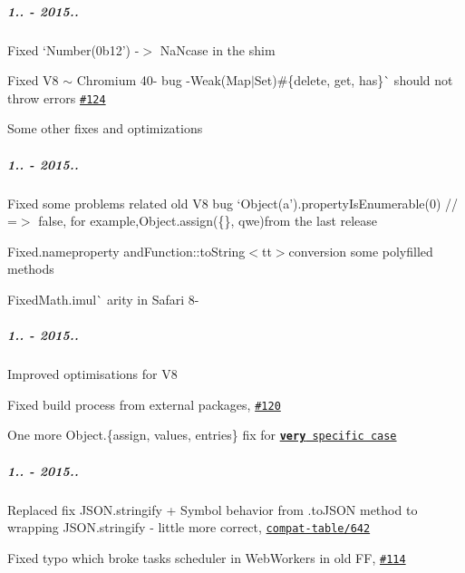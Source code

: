 \subparagraph*{1.. -\/ 2015..}


\begin{DoxyItemize}
\item Fixed `Number(\textquotesingle{}0b12') -\/$>$ NaN{\ttfamily case in the shim}
\item {\ttfamily Fixed V8 $\sim$ Chromium 40-\/ bug -\/}Weak(Map$\vert$\+Set)\#\{delete, get, has\}\`{} should not throw errors \href{https://github.com/zloirock/core-js/issues/124}{\tt \#124}
\item Some other fixes and optimizations
\end{DoxyItemize}

\subparagraph*{1.. -\/ 2015..}


\begin{DoxyItemize}
\item Fixed some problems related old V8 bug `Object(\textquotesingle{}a').property\+Is\+Enumerable(0) // =$>$ false{\ttfamily , for example,}Object.\+assign(\{\}, \textquotesingle{}qwe\textquotesingle{}){\ttfamily from the last release}
\item {\ttfamily Fixed}.name{\ttfamily property and}Function\+::to\+String$<$tt$>$conversion some polyfilled methods
\item FixedMath.\+imul\`{} arity in Safari 8-\/
\end{DoxyItemize}

\subparagraph*{1.. -\/ 2015..}


\begin{DoxyItemize}
\item Improved optimisations for V8
\item Fixed build process from external packages, \href{https://github.com/zloirock/core-js/pull/120}{\tt \#120}
\item One more {\ttfamily Object.\{assign, values, entries\}} fix for \href{https://github.com/ljharb/proposal-object-values-entries/issues/5}{\tt {\bfseries very} specific case}
\end{DoxyItemize}

\subparagraph*{1.. -\/ 2015..}


\begin{DoxyItemize}
\item Replaced fix {\ttfamily J\+S\+O\+N.\+stringify} + {\ttfamily Symbol} behavior from {\ttfamily .to\+J\+S\+ON} method to wrapping {\ttfamily J\+S\+O\+N.\+stringify} -\/ little more correct, \href{https://github.com/kangax/compat-table/pull/642}{\tt compat-\/table/642}
\item Fixed typo which broke tasks scheduler in Web\+Workers in old FF, \href{https://github.com/zloirock/core-js/pull/114}{\tt \#114}
\end{DoxyItemize}

